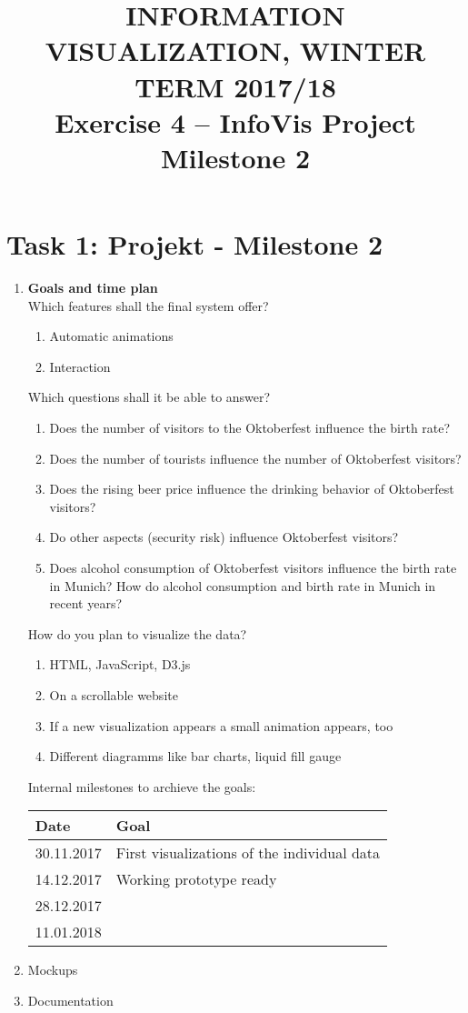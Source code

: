\documentclass[11pt, twoside, BCOR=8mm, DIV=12]{scrartcl}
\title{{\Large INFORMATION VISUALIZATION, WINTER TERM 2017/18} \\ Exercise 4 – InfoVis Project Milestone 2}
\begin{document}
\maketitle
\section*{Task 1: Projekt - Milestone 2}
\begin{enumerate}[label=\alph*)]
\item \textbf{Goals and time plan}\\
Which features shall the final system offer?
\begin{enumerate}[label=\arabic*)]
\item Automatic animations
\item Interaction
\end{enumerate}
Which questions shall it be able to answer?
\begin{enumerate}[label=\arabic*)]
\item Does the number of visitors to the Oktoberfest influence the birth rate?
\item Does the number of tourists influence the number of Oktoberfest visitors?
\item Does the rising beer price influence the drinking behavior of Oktoberfest visitors?
\item Do other aspects (security risk) influence Oktoberfest visitors?
\item Does alcohol consumption of  Oktoberfest visitors influence the birth rate in Munich? How do alcohol consumption and birth rate in Munich in recent years?
\end{enumerate}
How do you plan to visualize the data?
\begin{enumerate}[label=\arabic*)]
\item HTML, JavaScript, D3.js
\item On a scrollable website
\item If a new visualization appears a small animation appears, too
\item Different diagramms like bar charts, liquid fill gauge
\end{enumerate}
Internal milestones to archieve the goals:
\begin{table}[h]
\begin{tabular}{l l}
Date & Goal \\
\hline
30.11.2017 & First visualizations of the individual data\\
\hline
14.12.2017 & Working prototype ready\\
\hline
28.12.2017 & \\
\hline
11.01.2018 & \\
\end{tabular}
\end{table}

\item Mockups
\item Documentation
\end{enumerate}
\end{document}
